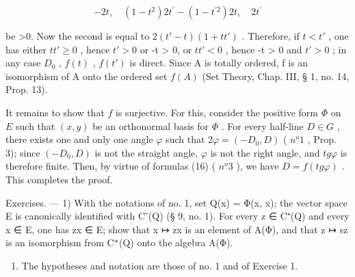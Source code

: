 \[
- 2 t, \quad (1 - t ^ {2}) 2 t ^ {\prime} - (1 - t ^ {\prime 2}) 2 t, \quad 2 t ^ {\prime}
\]

be \textgreater0. Now the second is equal to \(2(t' - t)(1 + tt')\) . Therefore, if \(t < t'\) , one has either \(tt' \geqslant 0\) , hence \(t' > 0\) or -t \textgreater{} 0, or \(tt' < 0\) , hence -t \textgreater{} 0 and \(t' > 0\) ; in any case \(D_{0}\) , \(f(t)\) , \(f(t')\) is direct. Since A is totally ordered, f is an isomorphism of A onto the ordered set \(f(A)\) (Set Theory, Chap. III, § 1, no. 14, Prop. 13).

It remains to show that \(f\) is surjective. For this, consider the positive form \(\Phi\) on \(E\) such that \((x, y)\) be an orthonormal basis for \(\Phi\) . For every half-line \(D \in G\) , there exists one and only one angle \(\varphi\) such that \(2\varphi = (-D_0, D)\) ( \(n^o 1\) , Prop. 3); since \((-D_0, D)\) is not the straight angle, \(\varphi\) is not the right angle, and \(tg\varphi\) is therefore finite. Then, by virtue of formulas (16) ( \(n^o 3\) ), we have \(D = f(tg\varphi)\) . This completes the proof.

Exercises. --- 1) With the notations of no. 1, set Q(x) = Φ(x, x); the vector space E is canonically identified with C⁻(Q) (§ 9, no. 1). For every z ∈ C⁺(Q) and every x ∈ E, one has zx ∈ E; show that x ↦ zx is an element of A(Φ), and that z ↦ sz is an isomorphism from C⁺(Q) onto the algebra A(Φ).

\begin{enumerate}
\def\labelenumi{\arabic{enumi})}
\setcounter{enumi}{1}
\tightlist
\item
  The hypotheses and notation are those of no. 1 and of Exercise 1.
\end{enumerate}

